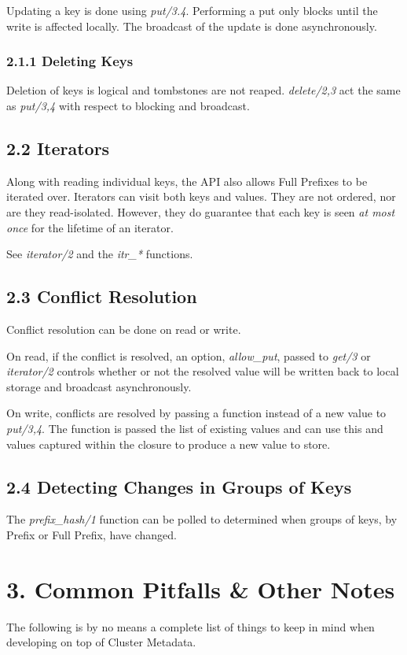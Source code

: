 \documentclass[letterpaper,10pt,english]{sphinxmanual}
\begin{document}
Updating a key is done using \emph{put/3.4}. Performing a put only blocks
until the write is affected locally. The broadcast of the update is
done asynchronously.


\subsubsection{2.1.1 Deleting Keys}
\label{riak_core_metadata:deleting-keys}
Deletion of keys is logical and tombstones are not
reaped. \emph{delete/2,3} act the same as \emph{put/3,4} with respect to
blocking and broadcast.


\subsection{2.2 Iterators}
\label{riak_core_metadata:iterators}
Along with reading individual keys, the API also allows Full Prefixes
to be iterated over. Iterators can visit both keys and values. They
are not ordered, nor are they read-isolated. However, they do
guarantee that each key is seen \emph{at most once} for the lifetime of an
iterator.

See \emph{iterator/2} and the \emph{itr\_*} functions.


\subsection{2.3 Conflict Resolution}
\label{riak_core_metadata:conflict-resolution}
Conflict resolution can be done on read or write.

On read, if the conflict is resolved, an option, \emph{allow\_put}, passed
to \emph{get/3} or \emph{iterator/2} controls whether or not the resolved value
will be written back to local storage and broadcast asynchronously.

On write, conflicts are resolved by passing a function instead of a
new value to \emph{put/3,4}. The function is passed the list of existing
values and can use this and values captured within the closure to
produce a new value to store.


\subsection{2.4 Detecting Changes in Groups of Keys}
\label{riak_core_metadata:detecting-changes-in-groups-of-keys}
The \emph{prefix\_hash/1} function can be polled to determined when groups
of keys, by Prefix or Full Prefix, have changed.


\section{3. Common Pitfalls \& Other Notes}
\label{riak_core_metadata:common-pitfalls-other-notes}
The following is by no means a complete list of things to keep in mind
when developing on top of Cluster Metadata.
\end{document}
